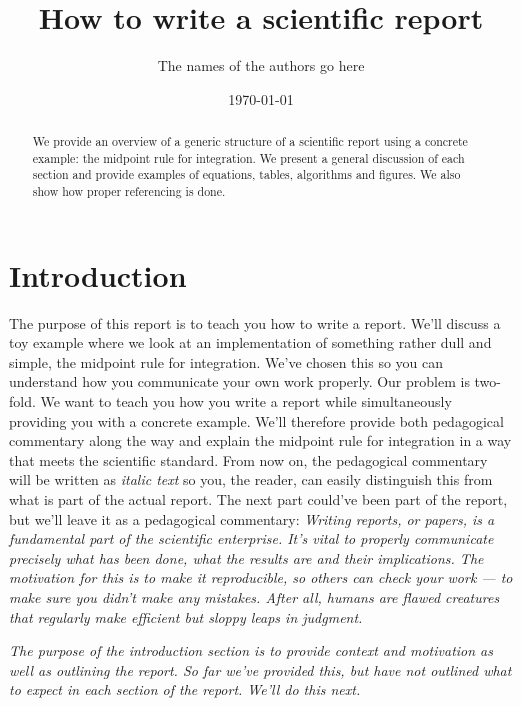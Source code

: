 \documentclass[english,notitlepage, reprint]{revtex4-1}  %
\begin{document}
\title{How to write a scientific report}      %
\author{The names of the authors go here}          %
\date{\today}                             %
\noaffiliation                            %

\begin{abstract}
	We provide an overview of a generic structure of a scientific report using a concrete example: the midpoint rule for integration. We present a general discussion of each section and provide examples of equations, tables, algorithms and figures. We also show how proper referencing is done.
\end{abstract}
\maketitle 

\section{Introduction}
The purpose of this report is to teach you how to write a report. We'll discuss a toy example where we look at an implementation of something rather dull and simple, the midpoint rule for integration. We've chosen this so you can understand how you communicate your own work properly. Our problem is two-fold. We want to teach you how you write a report while simultaneously providing you with a concrete example. We'll therefore provide both pedagogical commentary along the way and explain the midpoint rule for integration in a way that meets the scientific standard. From now on, the pedagogical commentary will be written as \textit{italic text} so you, the reader, can easily distinguish this from what is part of the actual report. The next part could've been part of the report, but we'll leave it as a pedagogical commentary:
\textit{Writing reports, or papers, is a fundamental part of the scientific enterprise. It's vital to properly communicate precisely what has been done, what the results are and their implications. The motivation for this is to make it reproducible, so others can check your work --- to make sure you didn't make any mistakes. After all, humans are flawed creatures that regularly make efficient but sloppy leaps in judgment.}

\textit{The purpose of the introduction section is to provide context and motivation as well as outlining the report. So far we've provided this, but have not outlined what to expect in each section of the report. We'll do this next.}
\end{document}

